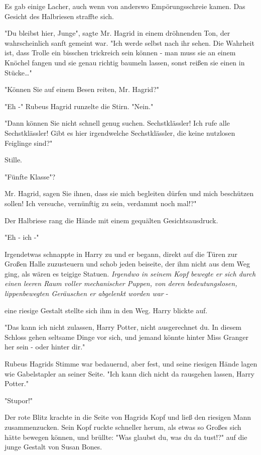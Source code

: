 {Es gab einige Lacher, auch wenn von anderswo Empörungsschreie kamen. Das Gesicht des Halbriesen straffte sich.

"Du bleibst hier, Junge", sagte Mr. Hagrid in einem dröhnenden Ton, der wahrscheinlich sanft gemeint war. "Ich werde selbst nach ihr sehen. Die Wahrheit ist, dass Trolle ein bisschen trickreich sein können - man muss sie an einem Knöchel fangen und sie genau richtig baumeln lassen, sonst reißen sie einen in Stücke…"

"Können Sie auf einem Besen reiten, Mr. Hagrid?"

"Eh -" Rubeus Hagrid runzelte die Stirn. "Nein."

"Dann können Sie nicht schnell genug suchen. Sechstklässler! Ich rufe alle Sechstklässler! Gibt es hier irgendwelche Sechstklässler, die keine nutzlosen Feiglinge sind?"

Stille.

"Fünfte Klasse"?

Mr. Hagrid, sagen Sie ihnen, dass sie mich begleiten dürfen und mich beschützen sollen! Ich versuche, vernünftig zu sein, verdammt noch mal!?"

Der Halbriese rang die Hände mit einem gequälten Gesichtsausdruck.

"Eh - ich -"

Irgendetwas schnappte in Harry zu und er begann, direkt auf die Türen zur Großen Halle zuzusteuern und schob jeden beiseite, der ihm nicht aus dem Weg ging, als wären es teigige Statuen. \emph{Irgendwo in seinem Kopf bewegte er sich durch einen leeren Raum voller mechanischer Puppen, von deren bedeutungslosen, lippenbewegten Geräuschen er abgelenkt worden war} -

eine riesige Gestalt stellte sich ihm in den Weg. Harry blickte auf.

"Das kann ich nicht zulassen, Harry Potter, nicht ausgerechnet du. In diesem Schloss gehen seltsame Dinge vor sich, und jemand könnte hinter Miss Granger her sein - oder hinter dir."

Rubeus Hagrids Stimme war bedauernd, aber fest, und seine riesigen Hände lagen wie Gabelstapler an seiner Seite. "Ich kann dich nicht da rausgehen lassen, Harry Potter."

"Stupor!"

Der rote Blitz krachte in die Seite von Hagrids Kopf und ließ den riesigen Mann zusammenzucken. Sein Kopf ruckte schneller herum, als etwas so Großes sich hätte bewegen können, und brüllte: "Was glaubst du, was du da tust!?" auf die junge Gestalt von Susan Bones.

}
